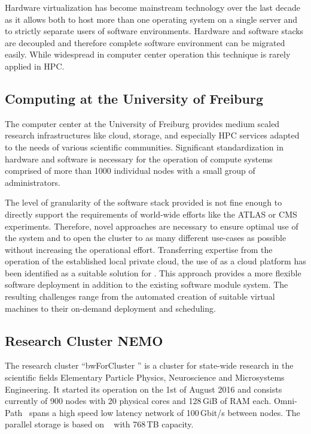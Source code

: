 Hardware virtualization has become mainstream technology over the last decade as it allows
both to host more than one operating system on a single server and to strictly
separate users of software environments.
Hardware and software stacks are decoupled and therefore complete software
environment can be migrated easily.
While widespread in computer center
operation this technique is rarely applied in HPC.

\subsection{Computing at the University of Freiburg}

The computer center at the University of Freiburg provides
medium scaled research
infrastructures like cloud, storage, and especially HPC services adapted to the
needs of various scientific communities. Significant standardization
in hardware and software is necessary for the operation of compute systems comprised of
more than 1000 individual nodes with a small group of administrators.

The level of granularity of the software stack provided is not fine enough to
directly support the requirements of world-wide efforts like the
ATLAS or CMS experiments.
Therefore, novel approaches are necessary to ensure optimal use of the system and to open the cluster to as many different use-cases as
possible without increasing the operational effort.
Transferring expertise from the operation of the established local
private cloud, %
the use of \Openstack as a cloud platform has been identified
as a
suitable solution for \NEMO. This approach provides a more flexible software
deployment in addition to the existing software module system.
The resulting challenges range from the automated creation of suitable
virtual machines to their on-demand deployment and scheduling.

\subsection{Research Cluster NEMO}

The research cluster ``bwForCluster \NEMO'' is a cluster for state-wide
research in the scientific fields Elementary Particle Physics, Neuroscience and
Microsystems Engineering. It started its operation on the 1st of August 2016
and consists currently of 900 nodes with 20 physical cores and 128\,GiB of RAM each.
Omni-Path~\cite{Omnipath} spans a high speed low latency network of 100\,Gbit/s between nodes.
The parallel storage is based on \BeeGFS~\cite{BeeGFS} with
768\,TB capacity.

